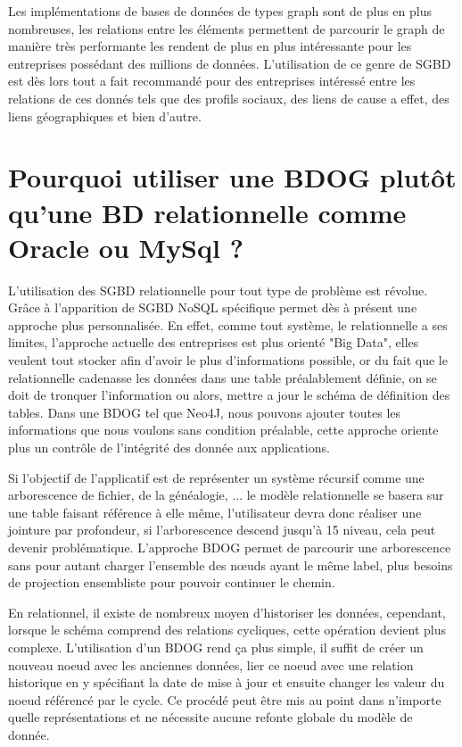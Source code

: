 \documentclass[a4paper,fleqn,12pt]{report}
\begin{document}
Les implémentations de bases de données de types graph sont de plus en plus nombreuses, les relations entre les éléments permettent de parcourir le graph de manière très performante les rendent de plus en plus intéressante pour les entreprises possédant des millions de données. L'utilisation de ce genre de SGBD est dès lors tout a fait recommandé pour des entreprises intéressé entre les relations de ces donnés tels que des profils sociaux, des liens de cause a effet, des liens géographiques et bien d'autre.

\section*{Pourquoi utiliser une BDOG plutôt qu'une BD relationnelle comme Oracle ou MySql ?}

L'utilisation des SGBD relationnelle pour tout type de problème est révolue. Grâce à l'apparition de SGBD NoSQL spécifique permet dès à présent une approche plus personnalisée. En effet, comme tout système, le relationnelle a ses limites, l'approche actuelle des entreprises est plus orienté "Big Data", elles veulent tout stocker afin d'avoir le plus d'informations possible, or du fait que le relationnelle cadenasse les données dans une table préalablement définie, on se doit de tronquer l'information ou alors, mettre a jour le schéma de définition des tables. Dans une BDOG tel que Neo4J, nous pouvons ajouter toutes les informations que nous voulons sans condition préalable, cette approche oriente plus un contrôle de l'intégrité des donnée aux applications.

Si l'objectif de l'applicatif est de représenter un système récursif comme une arborescence de fichier, de la généalogie, ... le modèle relationnelle se basera sur une table faisant référence à elle même, l'utilisateur devra donc réaliser une jointure par profondeur, si l'arborescence descend jusqu'à 15 niveau, cela peut devenir problématique. L'approche BDOG permet de parcourir une arborescence sans pour autant charger l'ensemble des nœuds ayant le même label, plus besoins de projection ensembliste pour pouvoir continuer le chemin.

En relationnel, il existe de nombreux moyen d'historiser les données, cependant, lorsque le schéma comprend des relations cycliques, cette opération devient plus complexe. L'utilisation d'un BDOG rend ça plus simple, il suffit de créer un nouveau noeud avec les anciennes données, lier ce noeud avec une relation historique en y spécifiant la date de mise à jour et ensuite changer les valeur du noeud référencé par le cycle. Ce procédé peut être mis au point dans n'importe quelle représentations et ne nécessite aucune refonte globale du modèle de donnée.
\end{document}
